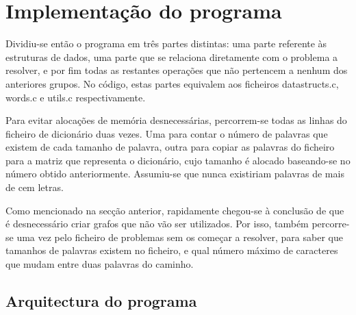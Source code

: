 \documentclass[a4paper, 11pt]{article}
\begin{document}
\section{Implementação do programa}
    \par Dividiu-se então o programa em três partes distintas: uma parte referente às estruturas de dados, uma parte que se relaciona diretamente com o problema a resolver, e por fim todas as restantes operações que não pertencem a nenhum dos anteriores grupos. No código, estas partes equivalem aos ficheiros datastructs.c, words.c e utils.c respectivamente.
    \par Para evitar alocações de memória desnecessárias, percorrem-se todas as linhas do ficheiro de dicionário duas vezes. Uma para contar o número de palavras que existem de cada tamanho de palavra, outra para copiar as palavras do ficheiro para a matriz que representa o dicionário, cujo tamanho é alocado baseando-se no número obtido anteriormente. Assumiu-se que nunca existiriam palavras de mais de cem letras.
    \par Como mencionado na secção anterior, rapidamente chegou-se à conclusão de que é desnecessário criar grafos que não vão ser utilizados. Por isso, também percorre-se uma vez pelo ficheiro de problemas sem os começar a resolver, para saber que tamanhos de palavras existem no ficheiro, e qual número máximo de caracteres que mudam entre duas palavras do caminho.
    
\subsection{Arquitectura do programa}
    
\end{document}
